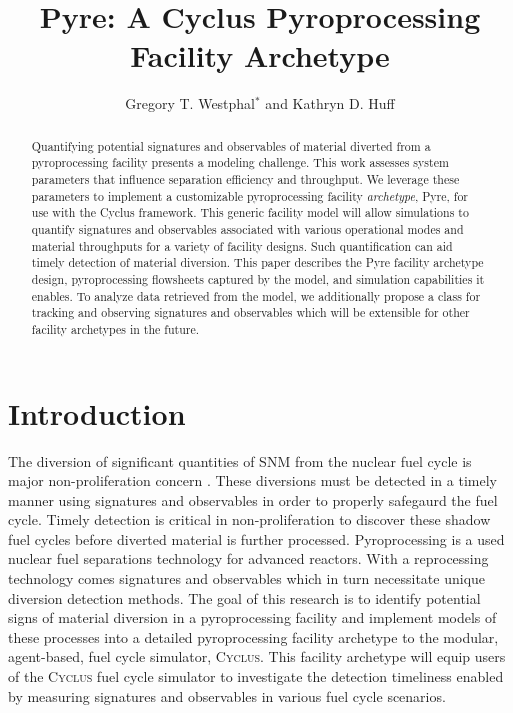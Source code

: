 \documentclass{anstrans}
\title{Pyre: A Cyclus Pyroprocessing Facility Archetype}
\author{Gregory T. Westphal$^*$ and Kathryn D. Huff}
\institute{
Dept. of Nuclear, Plasma and Radiological Engineering, University of Illinois at Urbana-Champaign \\
$^*$gtw2@illinois.edu
}
\newcommand{\Cyclus}{\textsc{Cyclus}\xspace}%
\begin{document}
\begin{abstract}
Quantifying potential signatures and observables of material diverted from a 
pyroprocessing facility presents a modeling challenge.
This work assesses system parameters that influence separation efficiency and 
throughput. We leverage these parameters to implement a customizable pyroprocessing facility \emph{archetype}, Pyre, for use with the Cyclus framework.
This generic facility model will allow simulations to 
quantify signatures and observables associated with various operational modes 
and material throughputs for a variety of facility designs. Such quantification 
can aid timely detection of material diversion. 
This paper describes the Pyre facility archetype design, pyroprocessing flowsheets captured by the model, and simulation capabilities it enables. 
To analyze data retrieved from the model, we additionally propose a class for tracking and 
observing signatures and observables which will be extensible for other 
facility archetypes in the future.
\end{abstract}
\section{Introduction}
The diversion of significant quantities of SNM from the nuclear fuel cycle is major non-proliferation 
concern \cite{noauthor_iaea_2017}. These diversions must be detected in a timely manner using signatures and observables in 
order to properly safegaurd the fuel cycle. Timely detection is critical in non-proliferation to discover these shadow fuel cycles
before diverted material is further processed. Pyroprocessing is a used nuclear fuel separations technology for advanced reactors. 
With a reprocessing technology comes signatures and observables which in turn necessitate unique diversion detection methods. 
The goal of this research is to identify potential signs of material diversion in a pyroprocessing facility and implement models 
of these processes into a detailed pyroprocessing facility archetype to the modular, agent-based, fuel cycle simulator, \Cyclus \cite{huff_fundamental_2016}. This facility archetype will equip users of the \Cyclus fuel cycle simulator to investigate the 
detection timeliness enabled by measuring signatures and observables in various fuel cycle scenarios.
\end{document}
